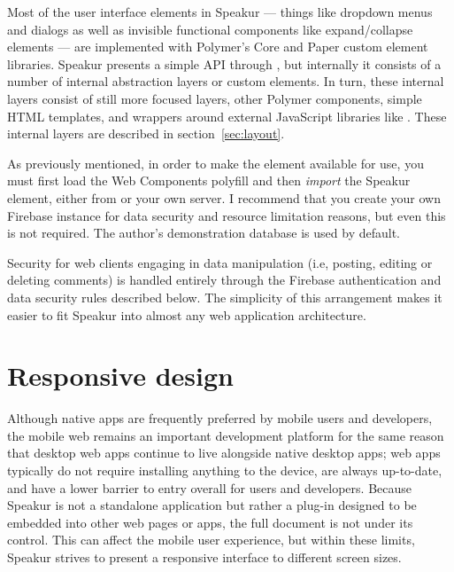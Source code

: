 Most of the user interface elements in Speakur 
--- things like dropdown menus and dialogs as well as invisible functional components like expand/collapse elements  
--- are implemented with Polymer's Core and Paper custom element libraries.
Speakur presents a simple API through ,
but internally it consists of a number of internal abstraction layers or custom elements.
In turn, these internal layers consist of still more focused layers, other Polymer components, 
simple HTML templates, 
and wrappers around external JavaScript libraries 
like .
These internal layers are described in section~\ref{sec:layout}.

As previously mentioned, in order to make the 
 element available for use, 
you must first load the Web Components polyfill and then \textit{import} the Speakur element, 
either from  or your own server.
I recommend that you create your own Firebase instance for data security and resource limitation reasons, but even this is not required. 
The author's demonstration database is used by default.

Security for web clients engaging in data manipulation 
(i.e, posting, editing or deleting comments) 
is handled entirely through the Firebase authentication 
and data security rules described below.
The simplicity of this arrangement makes it easier to fit Speakur into almost any web application architecture.

\section{Responsive design}
\label{bg:mobile}
Although native apps are frequently preferred by mobile users and developers, 
the mobile web remains an important development platform for the same reason that 
desktop web apps continue to live alongside native desktop apps; 
web apps typically do not require installing anything to the device, are always up-to-date, and have a lower barrier to entry overall for users and developers.
Because Speakur is not a standalone application but rather a plug-in designed to be embedded into other web pages or apps, 
the full document is not under its control.
This can affect the mobile user experience,
but within these limits, Speakur strives to present a responsive interface to different screen sizes.

